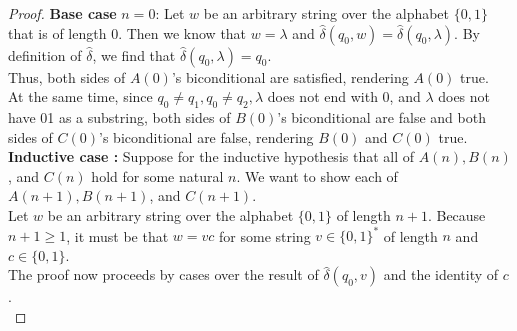 \documentclass[10pt]{article}
\begin{document}
\begin{enumerate}[label={}]
\begin{proof}
              \textbf{Base case} $n=0$: Let $w$ be an arbitrary string over the alphabet $\{0,1\}$ that is of length 0. Then we know that $w=\lambda$ and $\hat{\delta}\left(q_0, w\right)=\hat{\delta}\left(q_0, \lambda\right)$. By definition of $\hat{\delta}$, we find that $\hat{\delta}\left(q_0, \lambda\right)=q_0$.\\
              Thus, both sides of $A(0)$'s biconditional are satisfied, rendering $A(0)$ true.\\
              At the same time, since $q_0 \neq q_1, q_0 \neq q_2, \lambda$ does not end with 0, and $\lambda$ does not have 01 as a substring, both sides of $B(0)$'s biconditional are false and both sides of $C(0)$'s biconditional are false, rendering $B(0)$ and $C(0)$ true.\\

              \textbf{Inductive case :} Suppose for the inductive hypothesis that all of $A(n), B(n)$, and $C(n)$ hold for some natural $n$. We want to show each of $A(n+1), B(n+1)$, and $C(n+1)$.\\
              Let $w$ be an arbitrary string over the alphabet $\{0,1\}$ of length $n+1$. Because $n+1 \geq 1$, it must be that $w=v c$ for some string $v \in\{0,1\}^*$ of length $n$ and $c \in\{0,1\}$.\\
              The proof now proceeds by cases over the result of $\hat{\delta}\left(q_0, v\right)$ and the identity of $c$.\\


\end{proof}
\end{enumerate}
\end{document}
